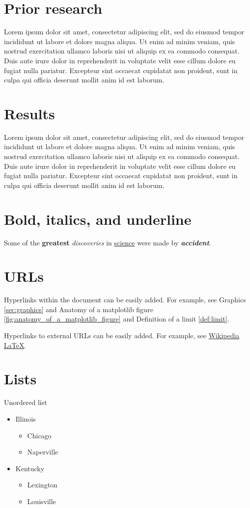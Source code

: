 \documentclass[10pt, letterpaper, twoside]{article}
\theoremstyle{myenv}
\theoremstyle{mytheorem}
\theoremstyle{mydefinition}
\begin{document}
\section{Prior research}
\label{sec:prior_research}
Lorem ipsum dolor sit amet, consectetur adipiscing elit, sed do eiusmod tempor incididunt ut labore et dolore magna aliqua. Ut enim ad minim veniam, quis nostrud exercitation ullamco laboris nisi ut aliquip ex ea commodo consequat. Duis aute irure dolor in reprehenderit in voluptate velit esse cillum dolore eu fugiat nulla pariatur. Excepteur sint occaecat cupidatat non proident, sunt in culpa qui officia deserunt mollit anim id est laborum.

\section{Results}
\label{sec:results}
Lorem ipsum dolor sit amet, consectetur adipiscing elit, sed do eiusmod tempor incididunt ut labore et dolore magna aliqua. Ut enim ad minim veniam, quis nostrud exercitation ullamco laboris nisi ut aliquip ex ea commodo consequat. Duis aute irure dolor in reprehenderit in voluptate velit esse cillum dolore eu fugiat nulla pariatur. Excepteur sint occaecat cupidatat non proident, sunt in culpa qui officia deserunt mollit anim id est laborum.

\newpage
\section{Bold, italics, and underline}
\label{sec:bold_italics_underline}
Some of the \textbf{greatest} \textit{discoveries} in \underline{science} were made by \textbf{\textit{accident}}.

\section{URLs}
\label{sec:urls}
Hyperlinks within the document can be easily added. For example, see Graphics \ref{sec:graphics} and Anatomy of a matplotlib figure \ref{fig:anatomy_of_a_matplotlib_figure} and Definition of a limit \ref{def:limit}.

Hyperlinks to external URLs can be easily added. For example, see \href{https://en.wikipedia.org/wiki/Latex}{Wikipedia \LaTeX}.
\section{Lists}
Unordered list
\begin{itemize}
    \item Illinois
        \begin{itemize}
            \item Chicago
            \item Naperville
        \end{itemize}
    \item Kentucky
        \begin{itemize}
            \item Lexington
            \item Louisville
        \end{itemize}
\end{itemize}
\end{document}
